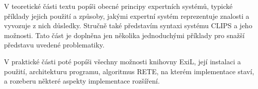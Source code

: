 V teoretické části textu popíši obecné principy expertních systémů, typické
příklady jejich použití a způsoby, jakými expertní systém reprezentuje znalosti
a vyvozuje z nich důsledky. Stručně také představím syntaxi systému CLIPS a jeho
možnosti. Tato část je doplněna jen několika jednoduchými příklady pro snažší
představu uvedené problematiky.

V praktické části poté popíši všechny možnosti knihovny ExiL, její instalaci a
použití, architekturu programu, algoritmus RETE, na kterém implementace staví, a
rozeberu některé aspekty implementace rozšíření.
